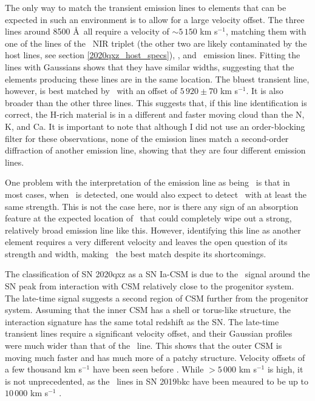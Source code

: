 \documentclass[a4paper,oneside,12pt, class=Latex/Classes/PhDthesisPSnPDF, crop=false]{standalone}
\begin{document}
The only way to match the transient emission lines to elements that can be expected in such an environment is to allow for a large velocity offset. The three lines around 8500 \AA\ all require a velocity of $\sim5\,150$ km s$^{-1}$, matching them with one of the lines of the \CaII\ NIR triplet (the other two are likely contaminated by the host lines, see section \ref{2020qxz_host_specs}), \NI, and \KI\ emission lines. Fitting the lines with Gaussians shows that they have similar widths, suggesting that the elements producing these lines are in the same location. The bluest transient line, however, is best matched by \Hbeta\ with an offset of $5\,920\pm70$ km s$^{-1}$. It is also broader than the other three lines. This suggests that, if this line identification is correct, the H-rich material is in a different and faster moving cloud than the N, K, and Ca. It is important to note that although I did not use an order-blocking filter for these observations, none of the emission lines match a second-order diffraction of another emission line, showing that they are four different emission lines.

One problem with the interpretation of the emission line as being \Hbeta\ is that in most cases, when \Hbeta\ is detected, one would also expect to detect \Halpha\ with at least the same strength. This is not the case here, nor is there any sign of an absorption feature at the expected location of \Halpha\ that could completely wipe out a strong, relatively broad emission line like this. However, identifying this line as another element requires a very different velocity and leaves the open question of its strength and width, making \Hbeta\ the best match despite its shortcomings.

The classification of SN 2020qxz as a SN Ia-CSM is due to the \Halpha\ signal around the SN peak from interaction with CSM relatively close to the progenitor system. The late-time signal suggests a second region of CSM further from the progenitor system. Assuming that the inner CSM has a shell or torus-like structure, the interaction signature has the same total redshift as the SN. The late-time transient lines require a significant velocity offset, and their Gaussian profiles were much wider than that of the \Halpha\ line. This shows that the outer CSM is moving much faster and has much more of a patchy structure. Velocity offsets of a few thousand km s$^{-1}$ have been seen before \citep{Maeda_exp_asymetry, Maguire_opt_NIR}. While $>5\,000$ km s$^{-1}$ is high, it is not unprecedented, as the \CaII\ lines in SN 2019bkc have been meaured to be up to $10\,000$ km s$^{-1}$ \citep{2019bkc_Chen, 2019bkc_Prentice}.
\end{document}

